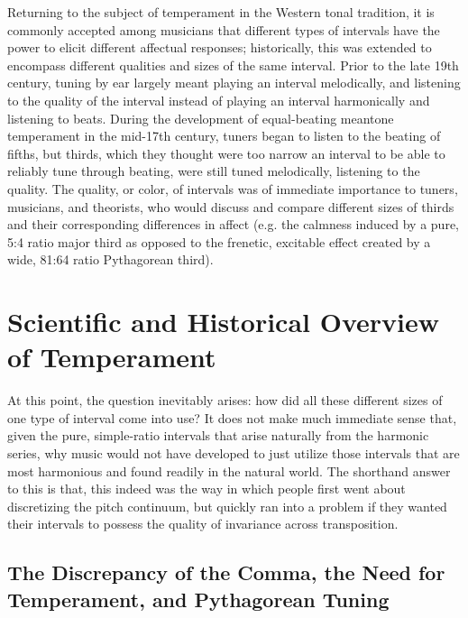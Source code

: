 Returning to the subject of temperament in the Western tonal tradition,
it is commonly accepted among musicians that different types of
intervals have the power to elicit different affectual responses;
historically, this was extended to encompass different qualities and
sizes of the same interval. Prior to the late 19th century, tuning by
ear largely meant playing an interval melodically, and listening to the
quality of the interval instead of playing an interval harmonically and
listening to beats. During the development of equal-beating meantone
temperament in the mid-17th century, tuners began to listen to the
beating of fifths, but thirds, which they thought were too narrow an
interval to be able to reliably tune through beating, were still tuned
melodically, listening to the quality. The quality, or color, of
intervals was of immediate importance to tuners, musicians, and
theorists, who would discuss and compare different sizes of thirds and
their corresponding differences in affect (e.g. the calmness induced by
a pure, 5:4 ratio major third as opposed to the frenetic, excitable
effect created by a wide, 81:64 ratio Pythagorean third).

    \section{Scientific and Historical Overview of
Temperament}\label{scientific-and-historical-overview-of-temperament}

At this point, the question inevitably arises: how did all these
different sizes of one type of interval come into use? It does not make
much immediate sense that, given the pure, simple-ratio intervals that
arise naturally from the harmonic series, why music would not have
developed to just utilize those intervals that are most harmonious and
found readily in the natural world. The shorthand answer to this is
that, this indeed was the way in which people first went about
discretizing the pitch continuum, but quickly ran into a problem if they
wanted their intervals to possess the quality of invariance across
transposition.

\subsection{The Discrepancy of the Comma, the Need for Temperament, and
Pythagorean
Tuning}\label{the-discrepancy-of-the-comma-the-need-for-temperament-and-pythagorean-tuning}

